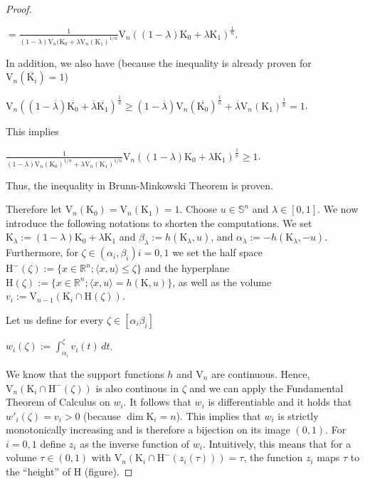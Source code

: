 \documentclass[a4paper]{book}
\numberwithin{theorem}{section}%
\begin{document}
\begin{proof}
\begin{center}
        $\displaystyle =\frac{1}{(1-\lambda)\mathrm{V}_{n}(\mathrm{K}_{0}+\lambda\mathrm{V}_{n}(\mathrm{K}_{1})^{1/n}}\mathrm{V}_{n}((1-\lambda)\mathrm{K}_{0}+\lambda\mathrm{K}_{1})^{\frac{1}{n}}$.
    \end{center}
    In addition, we also have (because the inequality is already proven for $\mathrm{V}_{n}(\overline{\mathrm{K}_{i}})=1$)
    \begin{center}
        $\displaystyle \mathrm{V}_{n}((1-\overline{\lambda})\overline{\mathrm{K}_{0}}+\overline{\lambda}\overline{\mathrm{K}_{1}})^{\frac{1}{n}}\geq(1-\overline{\lambda})\mathrm{V}_{n}(\overline{\mathrm{K}_{0}})^{\frac{1}{n}}+\overline{\lambda}\mathrm{V}_{n}(\mathrm{K}_{1})^{\frac{1}{n}}=1$.
    \end{center}
    This implies
    \begin{center}
        $\displaystyle \frac{1}{(1-\lambda)\mathrm{V}_{n}(\mathrm{K}_{0})^{1/n}+\lambda\mathrm{V}_{n}(\mathrm{K}_{1})^{1/n}}\mathrm{V}_{n}((1-\lambda)\mathrm{K}_{0}+\lambda\mathrm{K}_{1})^{\frac{1}{n}}\geq1$.
    \end{center}
    Thus, the inequality in Brunn-Minkowski Theorem is proven.

    Therefore let $\mathrm{V}_{n}(\mathrm{K}_{0})=\mathrm{V}_{n}(\mathrm{K}_{1})=1$. Choose $u\in\mathbb{S}^{n}$ and $\lambda\in[0,1]$. We now introduce the following notations to shorten the computations. We set $\mathrm{K}_{\lambda}:=(1-\lambda)\mathrm{K}_{0}+\lambda\mathrm{K}_{1}$ and $\beta_{\lambda}:=h(\mathrm{K}_{\lambda},u)$, and $\alpha_{\lambda}:=-h(\mathrm{K}_{\lambda},-u)$. Furthermore, for $\zeta\in(\alpha_{i},\beta_{i})$\;$i=0,1$ we set the half space $\mathrm{H}^{-}(\zeta):=\{x\in\mathbb{R}^{n};\langle x,u\rangle\leq\zeta\}$ and the hyperplane $\mathrm{H}(\zeta):=\{x\in\mathbb{R}^{n};\langle x,u\rangle=h(\mathrm{K},u)\}$, as well as the volume $v_{i}:=\mathrm{V}_{n-1}(\mathrm{K}_{i}\cap\mathrm{H}(\zeta))$.

    Let us define for every $\zeta\in[\alpha_{i}\beta_{i}]$
    \begin{center}
        $\displaystyle w_{i}(\zeta):=\int_{\alpha_{i}}^{\zeta}v_{i}(t)\,dt$.
    \end{center}
    We know that the support functions $h$ and $\mathrm{V}_{n}$ are continuous. Hence, $\mathrm{V}_{n}(\mathrm{K}_{i}\cap\mathrm{H}^{-}(\zeta))$ is also continous in $\zeta$ and we can apply the Fundamental Theorem of Calculus on $w_{i}$. It follows that $w_i$ is differentiable and it holds that $w'_{i}(\zeta)=v_{i}>0$ (because $\dim\mathrm{K}_{i}=n$). This implies that $w_{i}$ is strictly monotonically increasing and is therefore a bijection on its image $(0,1)$. For $i=0,1$ define $z_{i}$ as the inverse function of $w_{i}$. Intuitively, this means that for a volume $\tau\in(0,1)$ with $\mathrm{V}_{n}(\mathrm{K}_{i}\cap\mathrm{H}^{-}(z_{i}(\tau)))=\tau$, the function $z_{i}$ maps $\tau$ to the ``height'' of $\mathrm{H}$ (figure).


\end{proof}
\end{document}
